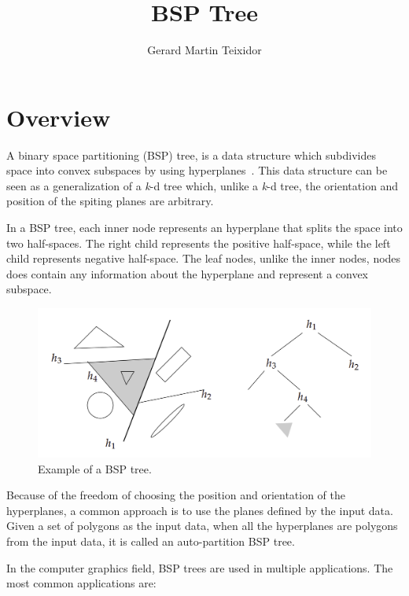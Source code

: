 \documentclass{article}
\title{BSP Tree}
\author{Gerard Martin Teixidor}
\begin{document}
\maketitle

\section*{Overview}
A binary space partitioning (BSP) tree, is a data structure which subdivides space into convex subspaces by using hyperplanes~\cite{original}. This data structure can be seen as a generalization of a \textit{k}-d tree which, unlike a \textit{k}-d tree, the orientation and position of the spiting planes are arbitrary.

In a BSP tree, each inner node represents an hyperplane that splits the space into two half-spaces. The right child represents the positive half-space, while the left child represents negative half-space. The leaf nodes, unlike the inner nodes, nodes does contain any information about the hyperplane and represent a convex subspace.

\begin{figure}[h]
\includegraphics[width=0.9\linewidth]{bsp_tree.png}
\caption{Example of a BSP tree.}
\end{figure}

Because of the freedom of choosing the position and orientation of the hyperplanes, a common approach is to use the planes defined by the input data. Given a set of polygons as the input data, when all the hyperplanes are polygons from the input data, it is called an auto-partition BSP tree.

In the computer graphics field, BSP trees are used in multiple applications. The most common applications are:
\end{document}
